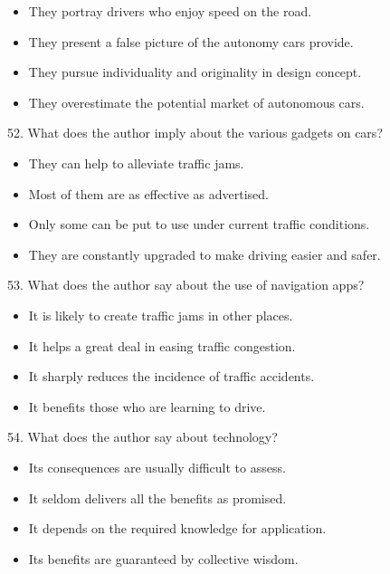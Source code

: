 \documentclass[UTF8,11pt]{ctexart}
\begin{document}
\begin{itemize}[leftmargin=2em,itemsep=.2em,topsep=.4em]\item[A.] They portray drivers who enjoy speed on the road.
\item[B.] They present a false picture of the autonomy cars provide.
\item[C.] They pursue individuality and originality in design concept.
\item[D.] They overestimate the potential market of autonomous cars.
\end{itemize}

52. What does the author imply about the various gadgets on cars?


\begin{itemize}[leftmargin=2em,itemsep=.2em,topsep=.4em]\item[A.] They can help to alleviate traffic jams.
\item[B.] Most of them are as effective as advertised.
\item[C.] Only some can be put to use under current traffic conditions.
\item[D.] They are constantly upgraded to make driving easier and safer.
\end{itemize}

53. What does the author say about the use of navigation apps?


\begin{itemize}[leftmargin=2em,itemsep=.2em,topsep=.4em]\item[A.] It is likely to create traffic jams in other places.
\item[B.] It helps a great deal in easing traffic congestion.
\item[C.] It sharply reduces the incidence of traffic accidents.
\item[D.] It benefits those who are learning to drive.
\end{itemize}

54. What does the author say about technology?


\begin{itemize}[leftmargin=2em,itemsep=.2em,topsep=.4em]\item[A.] Its consequences are usually difficult to assess.
\item[B.] It seldom delivers all the benefits as promised.
\item[C.] It depends on the required knowledge for application.
\item[D.] Its benefits are guaranteed by collective wisdom.
\end{itemize}
\end{document}
